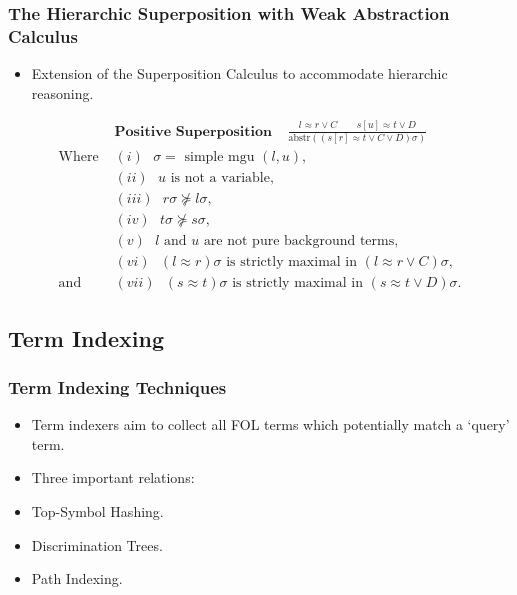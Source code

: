 \documentclass[10pt,xcolor={dvipsnames}]{beamer}
\newcommand{\HSWAC}{Hierarchic Superposition with Weak Abstraction Calculus}
\begin{document}
\begin{NoHyper}
\begin{frame}
  \frametitle{The \HSWAC}
  \begin{itemize}
  \item<1-> Extension of the Superposition Calculus to accommodate hierarchic reasoning.
  \end{itemize}
  \begin{align*}
&\textbf{Positive Superposition}\ \ \ \ \  \frac{l \approx r \lor C\quad \quad s[u] \approx t \lor D}{\text{abstr}((s[r] \approx t \lor C \lor D)\sigma)}\\
\text{Where } &(i) \text{ $\sigma = $ simple mgu $(l,u)$,}\\
&(ii) \text{ $u$ is not a variable,}\\
&(iii) \text{ $r\sigma \not\succeq l\sigma$,}\\
&(iv) \text{ $t\sigma \not\succeq s\sigma$,}\\
&(v) \text{ $l$ and $u$ are not pure background terms,}\\
&(vi) \text{ $(l \approx r)\sigma$ is strictly maximal in $(l \approx r \lor C)\sigma$,}\\
\text{and } &(vii) \text{ $(s \approx t)\sigma$ is strictly maximal in $(s \approx t \lor D)\sigma$.}
\end{align*}
\end{frame}

\subsection{Term Indexing} 
\begin{frame}
  \frametitle{Term Indexing Techniques}
  \begin{itemize}
  \item<1-> Term indexers aim to collect all FOL terms which potentially match a `query' term.
  \item<1-> Three important relations:
  \item<3-> Top-Symbol Hashing.
  \item<3-> Discrimination Trees.
  \item<3-> Path Indexing.
  \end{itemize}
\end{frame}


\end{NoHyper}
\end{document}
